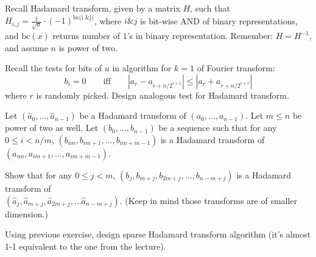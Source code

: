 \documentclass[12pt]{uebung}
\begin{document}
 

\newcommand{\bigo}{\mathcal{O}}
\renewcommand{\aufgname}{Exercise}

Recall Hadamard transform, given by a matrix $H$, such that $H_{i,j} = \frac{1}{\sqrt{n}} \cdot (-1)^{\textrm{bc(i \& j)}}$, where $i \& j$ is bit-wise AND of binary representations, and $\text{bc}(x)$ returns number of $1$'s in binary representation. Remember: $H = H^{-1}$, and assume $n$ is power of two.
\begin{aufg}
Recall the tests for bits of $u$ in algorithm for $k=1$ of Fourier transform:
$$b_{i} = 0 \quad\quad\text{iff}\quad\quad |a_r - a_{r+n/2^{i+1}}| \le |a_r + a_{r+n/2^{i+1}}|$$
where $r$ is randomly picked. Design analogous test for Hadamard transform.
\end{aufg}

\begin{aufg}[2 pts]
Let $(\hat{a}_0,\ldots,\hat{a}_{n-1})$ be a Hadamard transform of $(a_0,\ldots,a_{n-1})$. Let $m \le n$ be power of two as well. Let $(b_0,\ldots,b_{n-1})$ be a sequence such that for any $0 \le i < n/m$, $(b_{im},b_{im+1},\ldots,b_{im+m-1})$ is a Hadamard transform of $(a_{im},a_{im+1},\ldots,a_{im+m-1})$. 

Show that for any $0 \le j < m$, $(b_{j},b_{m+j}, b_{2m+j}, \ldots, b_{n-m+j})$ is a Hadamard transform of\\ $(\hat{a}_{j},\hat{a}_{m+j}, \hat{a}_{2m+j}, \ldots \hat{a}_{n-m+j})$. (Keep in mind those transforms are of smaller dimension.)
\end{aufg}

\begin{aufg}[2 pts]
Using previous exercise, design sparse Hadamard transform algorithm (it's almost 1-1 equivalent to the one from the lecture).
\end{aufg}
\end{document}
